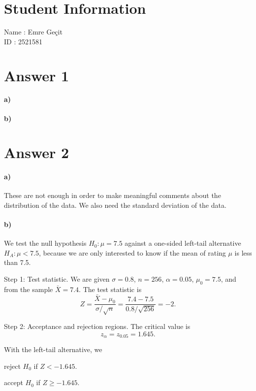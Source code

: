 \documentclass[12pt]{article}
\begin{document}
\section*{Student Information}

Name : Emre Geçit\\

ID : 2521581\\


\section*{Answer 1}
\paragraph{a)}
\paragraph{b)}

\section*{Answer 2}
\paragraph{a)}
These are not enough in order to make meaningful comments about the distribution of the data. We also need the standard deviation of the data.
\paragraph{b)}
We test the null hypothesis $H_0: \mu = 7.5$ against a one-sided left-tail alternative $H_A: \mu < 7.5$, because we are only interested to know if the mean of rating $\mu$ is less than 7.5.

Step 1: Test statistic. We are given $\sigma = 0.8$, $n = 256$, $\alpha = 0.05$, $\mu_0 = 7.5$, and from the sample $\bar{X}=7.4$. The test statistic is
\[
    Z = \frac{\bar{X} - \mu_0}{\sigma/\sqrt{n}} = \frac{7.4 - 7.5}{0.8/\sqrt{256}} = -2.
\]

Step 2: Acceptance and rejection regions. The critical value is
\[
    z_\alpha = z_{0.05} = 1.645.
\]

With the left-tail alternative, we
\begin{center}
    reject $H_0$ if $Z < -1.645$.

    accept $H_0$ if $Z \geq -1.645$.
\end{center}
\end{document}
